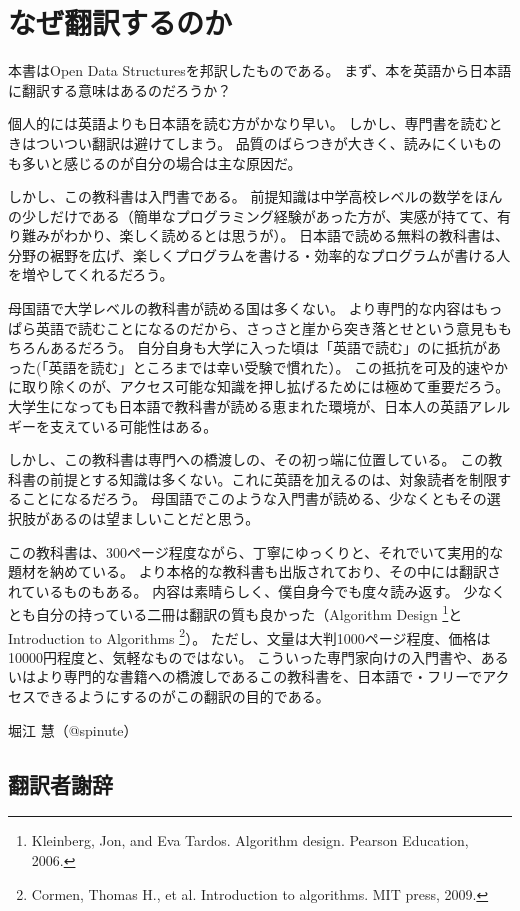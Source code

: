 \chapter*{なぜ翻訳するのか}
本書はOpen Data Structuresを邦訳したものである。
まず、本を英語から日本語に翻訳する意味はあるのだろうか？

個人的には英語よりも日本語を読む方がかなり早い。
しかし、専門書を読むときはついつい翻訳は避けてしまう。
品質のばらつきが大きく、読みにくいものも多いと感じるのが自分の場合は主な原因だ。

しかし、この教科書は入門書である。
前提知識は中学高校レベルの数学をほんの少しだけである（簡単なプログラミング経験があった方が、実感が持てて、有り難みがわかり、楽しく読めるとは思うが）。
日本語で読める無料の教科書は、分野の裾野を広げ、楽しくプログラムを書ける・効率的なプログラムが書ける人を増やしてくれるだろう。

母国語で大学レベルの教科書が読める国は多くない。
より専門的な内容はもっぱら英語で読むことになるのだから、さっさと崖から突き落とせという意見ももちろんあるだろう。
自分自身も大学に入った頃は「英語で読む」のに抵抗があった(「英語を読む」ところまでは幸い受験で慣れた）。
この抵抗を可及的速やかに取り除くのが、アクセス可能な知識を押し拡げるためには極めて重要だろう。
大学生になっても日本語で教科書が読める恵まれた環境が、日本人の英語アレルギーを支えている可能性はある。

しかし、この教科書は専門への橋渡しの、その初っ端に位置している。
この教科書の前提とする知識は多くない。これに英語を加えるのは、対象読者を制限することになるだろう。
母国語でこのような入門書が読める、少なくともその選択肢があるのは望ましいことだと思う。

この教科書は、300ページ程度ながら、丁寧にゆっくりと、それでいて実用的な題材を納めている。
より本格的な教科書も出版されており、その中には翻訳されているものもある。
内容は素晴らしく、僕自身今でも度々読み返す。
少なくとも自分の持っている二冊は翻訳の質も良かった（Algorithm Design \footnote{Kleinberg, Jon, and Eva Tardos. Algorithm design. Pearson Education, 2006.}とIntroduction to Algorithms \footnote{Cormen, Thomas H., et al. Introduction to algorithms. MIT press, 2009.}）。
ただし、文量は大判1000ページ程度、価格は10000円程度と、気軽なものではない。
こういった専門家向けの入門書や、あるいはより専門的な書籍への橋渡しであるこの教科書を、日本語で・フリーでアクセスできるようにするのがこの翻訳の目的である。

堀江 慧（@spinute）

\section*{翻訳者謝辞}

